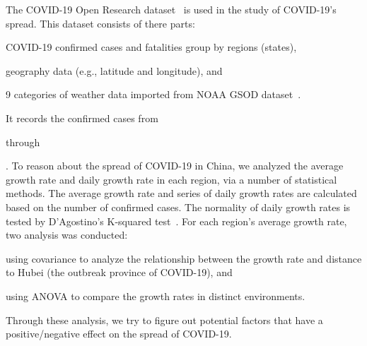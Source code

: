 The COVID-19 Open Research dataset~\cite{covid19weather} is used in the study of COVID-19's spread. This dataset consists of there parts:
\begin{inparaenum}[a)]
    \item COVID-19 confirmed cases and fatalities group by regions (states), 
    \item geography data (e.g., latitude and longitude), and
    \item 9 categories of weather data imported from NOAA GSOD dataset~\cite{weatherdata}.
\end{inparaenum}
It records the confirmed cases from \date{2020-01-22} through \date{2020-04-11}. To reason about the spread of COVID-19 in China, we analyzed the average growth rate and daily growth rate in each region, via a number of statistical methods. The average growth rate and series of daily growth rates are calculated based on the number of confirmed cases. The normality of daily growth rates is tested by D'Agostino's K-squared test~\cite{normaltest}. For each region's average growth rate, two analysis was conducted:
\begin{inparaenum}[a)]
    \item using covariance to analyze the relationship between the growth rate and distance to Hubei (the outbreak province of COVID-19), and 
    \item using ANOVA to compare the growth rates in distinct environments.
\end{inparaenum}
Through these analysis, we try to figure out potential factors that have a positive/negative effect on the spread of COVID-19.

